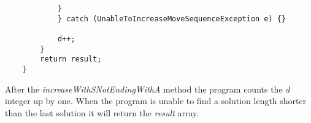 \begin{verbatim}
			}
			} catch (UnableToIncreaseMoveSequenceException e) {}

			d++;
		}
		return result;
	}
\end{verbatim}

After the  \textit{increaseWithSNotEndingWithA} method the program counts the \textit{d} integer up by one. 
When the program is unable to find a solution length shorter than the last solution it will return the \textit{result} array.